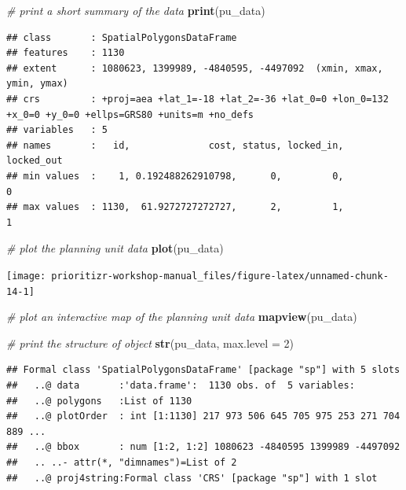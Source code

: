 \documentclass[12pt,]{book}
\newenvironment{Shaded}{\begin{snugshade}}{\end{snugshade}}
\newcommand{\KeywordTok}[1]{\textcolor[rgb]{0.13,0.29,0.53}{\textbf{#1}}}
\newcommand{\DataTypeTok}[1]{\textcolor[rgb]{0.13,0.29,0.53}{#1}}
\newcommand{\DecValTok}[1]{\textcolor[rgb]{0.00,0.00,0.81}{#1}}
\newcommand{\CommentTok}[1]{\textcolor[rgb]{0.56,0.35,0.01}{\textit{#1}}}
\newcommand{\NormalTok}[1]{#1}
\begin{document}
\begin{Shaded}
\begin{Highlighting}[]
\CommentTok{# print a short summary of the data}
\KeywordTok{print}\NormalTok{(pu_data)}
\end{Highlighting}
\end{Shaded}

\begin{verbatim}
## class       : SpatialPolygonsDataFrame 
## features    : 1130 
## extent      : 1080623, 1399989, -4840595, -4497092  (xmin, xmax, ymin, ymax)
## crs         : +proj=aea +lat_1=-18 +lat_2=-36 +lat_0=0 +lon_0=132 +x_0=0 +y_0=0 +ellps=GRS80 +units=m +no_defs 
## variables   : 5
## names       :   id,              cost, status, locked_in, locked_out 
## min values  :    1, 0.192488262910798,      0,         0,          0 
## max values  : 1130,  61.9272727272727,      2,         1,          1
\end{verbatim}

\begin{Shaded}
\begin{Highlighting}[]
\CommentTok{# plot the planning unit data}
\KeywordTok{plot}\NormalTok{(pu_data)}
\end{Highlighting}
\end{Shaded}

\begin{center}\texttt{[image: prioritizr-workshop-manual\_files/figure-latex/unnamed-chunk-14-1]} \end{center}

\begin{Shaded}
\begin{Highlighting}[]
\CommentTok{# plot an interactive map of the planning unit data}
\KeywordTok{mapview}\NormalTok{(pu_data)}
\end{Highlighting}
\end{Shaded}

\begin{Shaded}
\begin{Highlighting}[]
\CommentTok{# print the structure of object}
\KeywordTok{str}\NormalTok{(pu_data, }\DataTypeTok{max.level =} \DecValTok{2}\NormalTok{)}
\end{Highlighting}
\end{Shaded}

\begin{verbatim}
## Formal class 'SpatialPolygonsDataFrame' [package "sp"] with 5 slots
##   ..@ data       :'data.frame':  1130 obs. of  5 variables:
##   ..@ polygons   :List of 1130
##   ..@ plotOrder  : int [1:1130] 217 973 506 645 705 975 253 271 704 889 ...
##   ..@ bbox       : num [1:2, 1:2] 1080623 -4840595 1399989 -4497092
##   .. ..- attr(*, "dimnames")=List of 2
##   ..@ proj4string:Formal class 'CRS' [package "sp"] with 1 slot
\end{verbatim}
\end{document}
